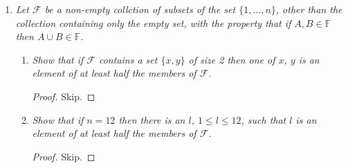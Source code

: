 \documentclass{article}
\begin{document}
\begin{enumerate}
\begin{enumerate}
\begin{proof}
          Using the above claim, we iteratively construct a set $C$ in
          $\mathcal{A}$ that is contained in $B_{k+1}$, a contradiction:
          Write $B_{k+1}=\{b_1,\ldots,b_{m+1}\}$. Let $C_0$ be an arbitrary
          set in $\mathcal{A}$. The idea of the construction is to
          gradually replace each element in $C_0$ with elements in
          $B_{k+1}$, using the above claim, until we get
          $C=C_m=\{b_1,\ldots,b_m\}$. At each stage $s\leq m$, $C_s$ will be
          contained in $\mathcal{A}$, and contain the elements
          $\{b_1,\ldots,b_s\}$. At stage $s+1$, write
          \[C_s=\{b_1,\ldots,b_s,a_{s+1},\ldots,a_m\} \in\mathcal{A}.\]
          If $b_{s+1}$ lies in $C_s$, set $C_{s+1}=C_s$ and go to the next
          stage. Otherwise $C_s\cup\{b_{s+1}\}$ lies in $\mathcal{B}$ by
          the above claim since $C_s$ lies in $\mathcal{A}$. Let
          $D_s\in\mathcal{B}$ be a set in $\mathcal{B}$ that contains
          $C_s\cup\{b_{s+1}\}$, and write
          \[D_s=\{b_1,\ldots,b_{s+1},d_{s+2},\ldots,d_{m+1}\}
          \in\mathcal{B}.\]
          Then let $C_{s+1}=\{b_1,\ldots,b_{s+1},d_{s+2},\ldots,d_{m}\}$;
          this will be contained in $\mathcal{A}$ from the above claim and
          contain $\{b_1,\ldots,b_{s+1}\}$ as required.
          
        \end{proof}
    \end{enumerate}

  \item \it Let $\mathcal{F}$ be a non-empty collction of subsets of the
    set $\{1,\ldots,n\}$, other than the collection containing only the
    empty set, with the property that if $A,B\in\mathbb{F}$ then $A\cup
    B\in\mathbb{F}$.

    \begin{enumerate}
      \item \it Show that if $\mathcal{F}$ contains a set $\{x,y\}$ of size
        2 then one of $x$, $y$ is an element of at least half the members
        of $\mathcal{F}$.

        \begin{proof}
          Skip.
        \end{proof}

      \item \it Show that if $n=12$ then there is an $l$, $1\leq l\leq12$,
        such that $l$ is an element of at least half the members of
        $\mathcal{F}$.

        \begin{proof}
          Skip.
        \end{proof}
    \end{enumerate}


\end{enumerate}
\end{document}
